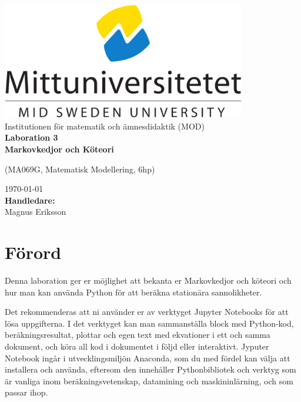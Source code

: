 \documentclass[a4paper]{article}
\newcommand{\gettitle}{Laboration 3 \\ Markovkedjor och Köteori} %
\newcommand{\getcourse}{(MA069G, Matematisk Modellering, 6hp)} %
\newcommand{\getsupervisor}{Magnus Eriksson}
\begin{document}
\begin{titlepage}
  \begin{center}
    \vspace*{1cm}
    \includegraphics[width=0.8\textwidth]{msu.png}\\[0.5cm]
    \Large
    Institutionen för matematik och ämnesdidaktik (MOD)\\[1cm]
    \Huge
    \textbf{\gettitle}

    \large
    \getcourse{}

    \vspace{1cm}

    \vfill
    \vspace{0.8cm}
    \small
    \today \\
    \Large
    \textbf{Handledare:}\\
    \getsupervisor{}
  \end{center}
\end{titlepage}

\tableofcontents
\newpage

\section{Förord}
Denna laboration ger er möjlighet att bekanta er Markovkedjor och köteori
och hur man kan använda Python för att beräkna stationära sannolikheter.

Det rekommenderas att ni använder er av verktyget Jupyter Notebooks för att lösa
uppgifterna. I det verktyget kan man sammanställa block med Python-kod, beräkningsresultat,
plottar och egen text med ekvationer i ett och samma dokument, och köra all kod i dokumentet
i följd eller interaktivt. Jyputer Notebook ingår i utvecklingsmiljön Anaconda, som du med
fördel kan välja att installera och använda, eftersom den innehåller Pythonbibliotek och
verktyg som är vanliga inom beräkningsvetenskap, datamining och maskininlärning, och som passar ihop.
\end{document}
